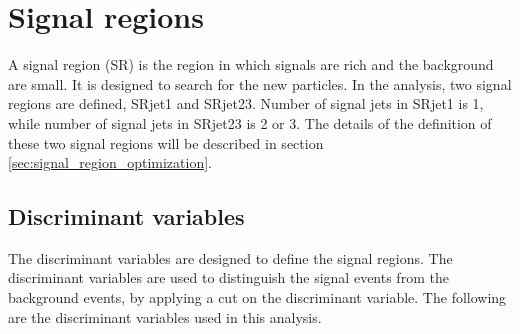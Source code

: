\chapter{Signal regions}
\label{ch:SR}

A signal region (SR) is the region in which signals are rich and the background are small.
It is designed to search for the new particles.
In the analysis, two signal regions are defined, SRjet1 and SRjet23.
Number of signal jets in SRjet1 is 1, while number of signal jets in SRjet23 is 2 or 3.
The details of the definition of these two signal regions will be described in section \ref{sec:signal_region_optimization}.

\section{Discriminant variables}
The discriminant variables are designed to define the signal regions.
The discriminant variables are used to distinguish the signal events from the background events, by applying a cut on the discriminant variable.
The following are the discriminant variables used in this analysis.
